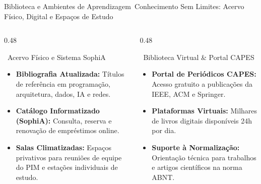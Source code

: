 \begin{frame}{Biblioteca e Ambientes de Aprendizagem}{\faBookReader\ Conhecimento Sem Limites: Acervo Físico, Digital e Espaços de Estudo}
  \begin{columns}[t]
    \begin{column}{0.48\textwidth}
      \begin{moderncard}{\faBook\ Acervo Físico e Sistema SophiA}
        \scriptsize
        \begin{itemize}\setlength{\itemsep}{0.25em}
          \item \textbf{Bibliografia Atualizada:} Títulos de referência em programação, arquitetura, dados, IA e redes.
          \item \textbf{Catálogo Informatizado (SophiA):} Consulta, reserva e renovação de empréstimos online.
          \item \textbf{Salas Climatizadas:} Espaços privativos para reuniões de equipe do PIM e estações individuais de estudo.
        \end{itemize}
      \end{moderncard}
    \end{column}
    
    \begin{column}{0.48\textwidth}
      \begin{purplecard}{\faGlobeAmericas\ Biblioteca Virtual \& Portal CAPES}
        \scriptsize
        \begin{itemize}\setlength{\itemsep}{0.25em}
          \item \textbf{Portal de Periódicos CAPES:} Acesso gratuito a publicações da IEEE, ACM e Springer.
          \item \textbf{Plataformas Virtuais:} Milhares de livros digitais disponíveis 24h por dia.
          \item \textbf{Suporte à Normalização:} Orientação técnica para trabalhos e artigos científicos na norma ABNT.
        \end{itemize}
      \end{purplecard}
    \end{column}
  \end{columns}
\end{frame}
